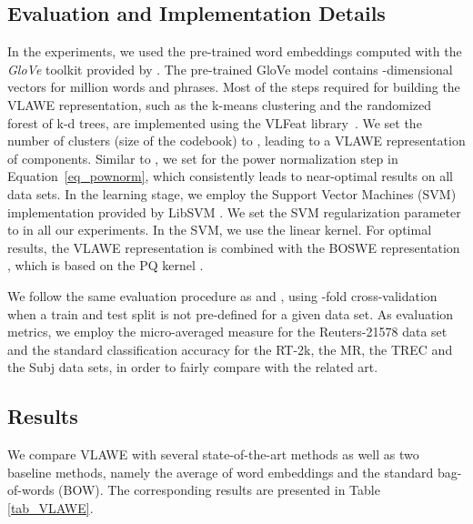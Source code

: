 \documentclass[11pt,a4paper]{article}
\begin{document}
\vspace*{-0.1cm}
\subsection{Evaluation and Implementation Details}
\vspace*{-0.1cm}

In the experiments, we used the pre-trained word embeddings computed with the \emph{GloVe} toolkit provided by . The pre-trained GloVe model contains -dimensional vectors for  million words and phrases. Most of the steps required for building the VLAWE representation, such as the k-means clustering and the randomized forest of k-d trees, are implemented using the VLFeat library~\cite{vedaldi-vlfeat-2008}. We set the number of clusters (size of the codebook) to , leading to a VLAWE representation of  components. Similar to , we set  for the power normalization step in Equation~\eqref{eq_pownorm}, which consistently leads to near-optimal results on all data sets. In the learning stage, we employ the Support Vector Machines (SVM) implementation provided by LibSVM \cite{LibSVM-2011}. We set the SVM regularization parameter to  in all our experiments. In the SVM, we use the linear kernel. For optimal results, the VLAWE representation is combined with the BOSWE representation \cite{Ionescu-KES-2017}, which is based on the PQ kernel \cite{Ionescu-ICIAP-2013a,Ionescu-PRL-2015}. 

We follow the same evaluation procedure as  and , using -fold cross-validation when a train and test split is not pre-defined for a given data set. As evaluation metrics, we employ the micro-averaged  measure for the Reuters-21578 data set and the standard classification accuracy for the RT-2k, the MR, the TREC and the Subj data sets, in order to fairly compare with the related art.

\vspace*{-0.1cm}
\subsection{Results}
\vspace*{-0.1cm}

We compare VLAWE with several state-of-the-art methods \cite{Ionescu-KES-2017,Cheng-IJCAI-2018,Fu-ESA-2018,Hill-NAACL-2016,Iyyer-ACL-2015,Kim-EMNLP-2014,Kiros-NIPS-2015,Le-ICML-2014,Liu-IJCAI-2017,Shen-ACL-2018,Torki-ACL-2018,Xue-TKDE-2009,Zhao-IJCAI-2015,Zhou-COLING-2016,Zhou-IJCAI-2018} as well as two baseline methods, namely the average of word embeddings and the standard bag-of-words (BOW). The corresponding results are presented in Table \ref{tab_VLAWE}.
\end{document}
